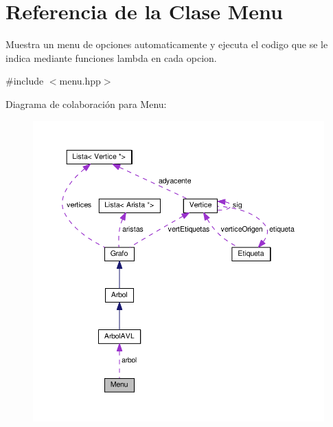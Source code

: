 \hypertarget{classMenu}{}\section{Referencia de la Clase Menu}
\label{classMenu}


Muestra un menu de opciones automaticamente y ejecuta el codigo que se le indica mediante funciones lambda en cada opcion.  




{\ttfamily \#include $<$menu.\+hpp$>$}



Diagrama de colaboración para Menu\+:\nopagebreak
\begin{figure}[H]
\begin{center}
\leavevmode
\includegraphics[width=350pt]{classMenu__coll__graph}
\end{center}
\end{figure}
